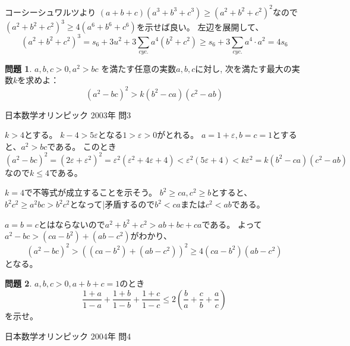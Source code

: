 \documentclass[uplatex, a5paper]{jsarticle}
\makeatletter
\theoremstyle{definition}
\newtheorem{prob}{問題}
\renewenvironment{proof}[1][\proofname]{
  \pushQED{\qed}%
  \normalfont \topsep6\p@\@plus6\p@\relax
  \trivlist
  \item[\hskip\labelsep
    #1\@addpunct{\textbf{.}}]\ignorespaces
}{%
  \popQED\endtrivlist\@endpefalse
}
\providecommand{\proofname}{証明}
\def\qed{\hfill $\Box$}
\makeatother
\begin{document}
\begin{proof}
  コーシーシュワルツより
  \((a+b+c)(a^3+b^3+c^3) \geq ( a^2+b^2+c^2 )^2\)なので
  \((a^2+b^2+c^2)^3 \geq 4(a^6+b^6+c^6)\)を示せば良い。
  左辺を展開して、
  \[
  (a^2+b^2+c^2)^3 = s_6 + 3u^2 + 3\sum_{cyc.} a^4(b^2+c^2) \geq s_6 + 3\sum_{cyc.} a^4\cdot a^2 = 4s_6
  \]
\end{proof}











\newpage

\begin{prob}
  \(a , b , c > 0 , a^2 > bc\)
  を満たす任意の実数\(a,b,c\)に対し,
  次を満たす最大の実数\(k\)を求めよ：
  \[
  (a^2-bc)^2 > k(b^2-ca)(c^2-ab)
  \]
  \begin{flushright}
    日本数学オリンピック 2003年 問3
  \end{flushright}
\end{prob}


\begin{proof}
  \(k>4\)とする。
  \(k-4 > 5 \varepsilon\)となる\(1> \varepsilon > 0\)がとれる。
  \(a= 1+ \varepsilon , b=c=1\)とすると、\(a^2 > bc\)である。
  このとき
  \[
  (a^2 -bc)^2 = ( 2\varepsilon + \varepsilon ^2 ) ^2
  = \varepsilon ^2 ( \varepsilon ^2 + 4\varepsilon + 4)
  < \varepsilon ^2( 5\varepsilon + 4)
  < k\varepsilon ^2
  = k(b^2 -ca)(c^2-ab)
  \]
  なので\(k\leq 4\)である。

  \(k=4\)で不等式が成立することを示そう。
  \(b^2 \geq ca , c^2 \geq b\)とすると、
  \(b^2c^2 \geq a^2 bc > b^2c^2\)となって|矛盾するので\(b^2 < ca\)または\(c^2 <ab\)である。

  \(a=b=c\)とはならないので\(a^2+b^2+c^2 > ab+bc+ca\)である。
  よって\(a^2-bc > (ca -b^2)+ (ab-c^2)\)がわかり、
  \[
  (a^2-bc)^2 > \left( ( ca-b^2) + (ab-c^2 ) \right) ^2 \geq 4(ca-b^2)(ab-c^2)
  \]
  となる。
\end{proof}











\newpage

\begin{prob}
  \(a,b,c > 0 , a+b+c=1\)のとき
  \[
  \frac{1+a}{1-a} + \frac{1+b}{1-b} + \frac{1+c}{1-c}
  \leq 2 \left( \frac{b}{a} + \frac{c}{b} + \frac{a}{c} \right)
  \]
  を示せ。
  \begin{flushright}
    日本数学オリンピック 2004年 問4
  \end{flushright}
\end{prob}
\end{document}
